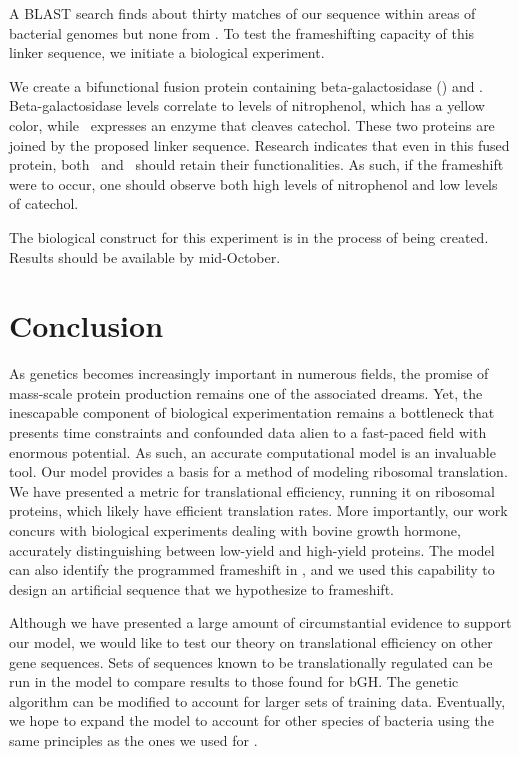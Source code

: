 \documentclass[12pt]{article}
\numberwithin{equation}{section}
\begin{document}
A BLAST search finds about thirty matches of our sequence within areas of
bacterial genomes but none from \ecoli. To test the frameshifting capacity of
this linker sequence, we initiate a biological experiment.

We create a bifunctional fusion protein containing beta-galactosidase (\bgals) 
and \xylE.  Beta-galactosidase levels correlate to
levels of nitrophenol, which has a yellow color, while \xylE\ expresses
an enzyme that cleaves catechol.  These two proteins are joined by
the proposed linker sequence.  Research indicates that even in this
fused protein, both \bgals\ and \xylE\ should retain their functionalities.
As such, if the frameshift were to occur, one should observe both 
high levels of nitrophenol and low levels of catechol.

The biological construct for this experiment is in the process of being created.
Results should be available by mid-October.

\section{Conclusion}

As genetics becomes increasingly important in numerous fields, the
promise of mass-scale protein production remains one of the associated dreams.
Yet, the inescapable
component of biological experimentation remains a bottleneck that
presents time constraints and confounded data
alien to a fast-paced field with enormous potential. As such, an
accurate computational model is an invaluable tool. 
Our model provides a basis for a method of modeling ribosomal translation.
We have presented a metric for translational efficiency, running it on
ribosomal proteins, which likely have efficient translation rates.
More importantly, our work concurs with biological experiments dealing with bovine growth hormone,
accurately distinguishing between low-yield and high-yield proteins.
The model can also identify the programmed frameshift in \prfB,
and we used this capability to design an artificial sequence that we hypothesize to frameshift.

Although we have presented a large amount of circumstantial evidence
to support our model, we would like to test our theory on translational efficiency
on other gene sequences.  Sets of sequences known to be translationally regulated
can be run in the model to compare results to those found for bGH.
The genetic algorithm can be modified to account for larger sets of training
data.  Eventually, we hope to expand the model to account for other species of
bacteria using the same principles as the ones we used for \ecoli.
\end{document}
